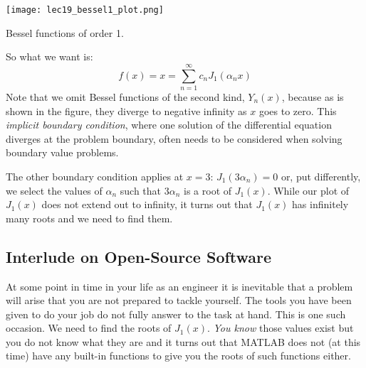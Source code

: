 \vspace{0.25cm}
\begin{marginfigure}
\texttt{[image: lec19\_bessel1\_plot.png]}
\label{fig:lec19-bessel}
\caption{Bessel functions of order 1.}
\end{marginfigure}
\noindent So what we want is:
\begin{equation*}
f(x) = x = \sum\limits_{n=1}^{\infty}c_n J_{1}\left(\alpha_n x\right)
\end{equation*}
Note that we omit Bessel functions of the second kind, $Y_n(x)$, because as is shown in the figure, they diverge to negative infinity as $x$ goes to zero.  This \emph{implicit boundary condition}, where one solution of the differential equation diverges at the problem boundary, often needs to be considered when solving boundary value problems.

The other boundary condition applies at $x=3$: $J_{1}(3\alpha_n) = 0$ or, put differently, we select the values of $\alpha_n$ such that $3\alpha_n$ is a root of $J_{1}(x)$.  While our plot of $J_1(x)$ does not extend out to infinity, it turns out that $J_1(x)$ has infinitely many roots and we need to find them.

\subsection{Interlude on Open-Source Software}
At some point in time in your life as an engineer it is inevitable that a problem will arise that you are not prepared to tackle yourself. The tools you have been given to do your job do not fully answer to the task at hand.  This is one such occasion.  We need to find the roots of $J_1(x)$.  \emph{You know} those values exist but you do not know what they are and it turns out that MATLAB does not (at this time) have any built-in functions to give you the roots of such functions either.

\vspace{0.15cm}


